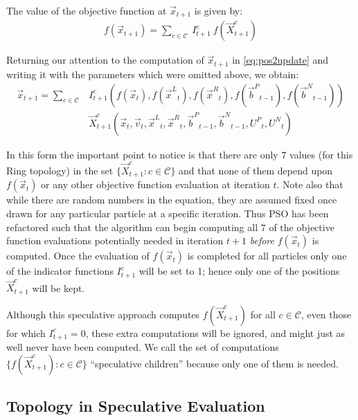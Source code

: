 \documentclass[smallcondensed]{svjour3}
\providecommand{\pers}{\ensuremath{P}}
\providecommand{\neigh}{\ensuremath{N}}
\providecommand{\leftind}{\ensuremath{L}}
\providecommand{\rightind}{\ensuremath{R}}
\providecommand{\nURand}{\ensuremath{U^\neigh}}
\providecommand{\pURand}{\ensuremath{U^\pers}}
\providecommand{\ppos}{\ensuremath{\Vec{x}}}
\providecommand{\pvel}{\ensuremath{\Vec{v}}}
\providecommand{\nbest}{\ensuremath{\Vec{b}^\neigh}}
\providecommand{\pbest}{\ensuremath{\Vec{b}^\pers}}
\providecommand{\ofunc}{\ensuremath{f}}
\providecommand{\indic}{\ensuremath{I}}
\providecommand{\specpos}{\ensuremath{\vec{X}}}
\providecommand{\leftn}{\ensuremath{\Vec{x}^\leftind}}
\providecommand{\rightn}{\ensuremath{\Vec{x}^\rightind}}
\providecommand{\caseset}{\ensuremath{\mathcal{C}}}
\providecommand{\casegen}{\ensuremath{c}}
\begin{document}
The value of the objective function at $\ppos_{t+1}$ is given by:
\begin{align}
\label{eq:val2update}
	\ofunc (\ppos_{t+1}) = \sum_{c \in \caseset} \ \indic_{t+1}^{c}
	\ \ofunc(\specpos_{t+1}^{c})
\end{align}

Returning our attention to the computation of $\ppos_{t+1}$ in
\eqref{eq:pos2update} and writing it with the parameters which were omitted
above, we obtain:
\begin{align}
\nonumber
  \ppos_{t+1} = \sum_{c \in \caseset}
	&\indic_{t+1}^{c}(\ofunc ( \ppos_{t} ) ,\ofunc(\leftn_{t}),
	\ofunc(\rightn_{t}) ,\ofunc(\pbest_{t-1}) ,\ofunc(\nbest_{t-1})) \\
\label{eq:val2updatelong}
	& \specpos_{t+1}^{c}(\ppos_{t},\pvel_{t},\leftn_{t},\rightn_{t},
	\pbest_{t-1},\nbest_{t-1},\pURand_{t}, \nURand_{t})
\end{align}

In this form the important point to notice is that there are only $7$ values
(for this Ring topology) in the set $\{\specpos_{t+1}^{\casegen}: \casegen \in
\caseset\}$ and that none of them depend upon $f(\ppos_t)$ or any other
objective function evaluation at iteration $t$.  Note also that while there are
random numbers in the equation, they are assumed fixed once drawn for any
particular particle at a specific iteration.  Thus PSO has been refactored such
that the algorithm can begin computing all $7$ of the objective function
evaluations potentially needed in iteration $t+1$ \emph{before} $f(\ppos_t)$ is
computed.  Once the evaluation of $f(\ppos_{t})$ is completed for all particles
only one of the indicator functions $\indic_{t+1}^{\casegen}$ will be set to 1;
hence only one of the positions $\specpos_{t+1}^\casegen$ will be kept.

Although this speculative approach computes $\ofunc(\specpos_{t+1}^{\casegen})$
for all $\casegen \in \caseset$, even those for which $\indic_{t+1}^{\casegen}
= 0$, these extra computations will be ignored, and might just as well never
have been computed.  We call the set of computations
$\{\ofunc(\specpos_{t+1}^{c}) : \casegen \in \caseset\}$ ``speculative
children'' because only one of them is needed.

\subsection{Topology in Speculative Evaluation}
\label{sec:topology}
\end{document}
